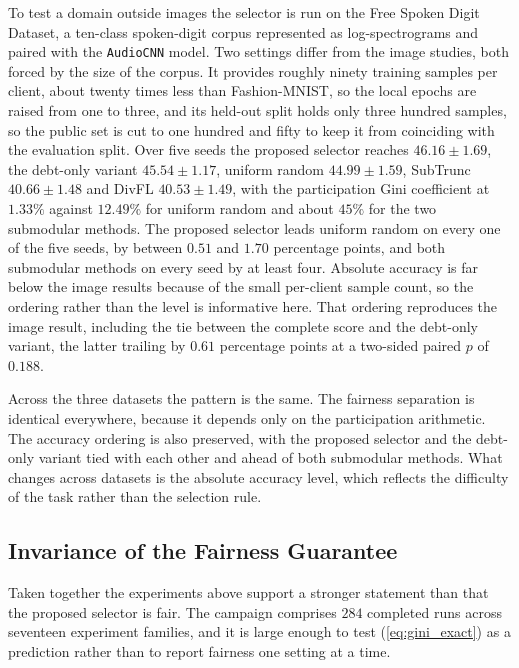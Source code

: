 \documentclass[journal]{IEEEtran}
\newcommand{\rev}[1]{#1}
\begin{document}
\rev{To test a domain outside images the selector is run on the Free Spoken Digit Dataset, a ten-class spoken-digit corpus represented as log-spectrograms and paired with the \texttt{AudioCNN} model. Two settings differ from the image studies, both forced by the size of the corpus. It provides roughly ninety training samples per client, about twenty times less than Fashion-MNIST, so the local epochs are raised from one to three, and its held-out split holds only three hundred samples, so the public set is cut to one hundred and fifty to keep it from coinciding with the evaluation split. Over five seeds the proposed selector reaches $46.16 \pm 1.69$, the debt-only variant $45.54 \pm 1.17$, uniform random $44.99 \pm 1.59$, SubTrunc $40.66 \pm 1.48$ and DivFL $40.53 \pm 1.49$, with the participation Gini coefficient at $1.33\%$ against $12.49\%$ for uniform random and about $45\%$ for the two submodular methods. The proposed selector leads uniform random on every one of the five seeds, by between $0.51$ and $1.70$ percentage points, and both submodular methods on every seed by at least four. Absolute accuracy is far below the image results because of the small per-client sample count, so the ordering rather than the level is informative here. That ordering reproduces the image result, including the tie between the complete score and the debt-only variant, the latter trailing by $0.61$ percentage points at a two-sided paired $p$ of $0.188$.}

\rev{Across the three datasets the pattern is the same. The fairness separation is identical everywhere, because it depends only on the participation arithmetic. The accuracy ordering is also preserved, with the proposed selector and the debt-only variant tied with each other and ahead of both submodular methods. What changes across datasets is the absolute accuracy level, which reflects the difficulty of the task rather than the selection rule.}

\subsection{Invariance of the Fairness Guarantee}
\label{ssec:exp-invariance}

\rev{Taken together the experiments above support a stronger statement than that the proposed selector is fair. The campaign comprises $284$ completed runs across seventeen experiment families, and it is large enough to test (\ref{eq:gini_exact}) as a prediction rather than to report fairness one setting at a time.}
\end{document}
